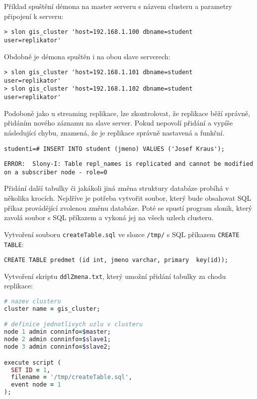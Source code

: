 Příklad spuštění démona na master serveru s názvem clusteru a parametry připojení k serveru:
\begin{lstlisting}
> slon gis_cluster 'host=192.168.1.100 dbname=student  user=replikator'
\end{lstlisting}
Obdobně je démona spuštěn i na obou slave serverech:
\begin{lstlisting}
> slon gis_cluster 'host=192.168.1.101 dbname=student  user=replikator'
> slon gis_cluster 'host=192.168.1.102 dbname=student  user=replikator'
\end{lstlisting}

Podoboně jako u streaming replikace, lze zkontrolovat, že replikace běží správně, přidáním nového záznamu na slave server. Pokud nepovolí přidání a vypíše následující chybu, znamená, že je replikace správně nastavená a funkční.

\begin{lstlisting}
studenti=# INSERT INTO student (jmeno) VALUES ('Josef Kraus');
\end{lstlisting}
\begin{lstlisting}[identifierstyle=\color{black},stringstyle=\color{black},keywordstyle=\color{black}]
ERROR:  Slony-I: Table repl_names is replicated and cannot be modified on a subscriber node - role=0
\end{lstlisting}

Přidání další tabulky či jakákoli jiná změna struktury databáze probíhá v několika krocích. Nejdříve je potřeba vytvořit soubor, který bude obsahovat SQL příkaz provádějící zvolenou změnu databáze. Poté se spustí program slonik, který zavolá soubor s SQL příkazem a vykoná jej na všech uzlech clusteru. 

Vytvoření souboru \texttt{createTable.sql} ve slozce \texttt{/tmp/} s SQL příkazem \texttt{CREATE TABLE}:

\begin{lstlisting}
CREATE TABLE predmet (id int, jmeno varchar, primary  key(id));
\end{lstlisting}

Vytvoření skriptu \texttt{ddlZmena.txt}, který umožní přidání tabulky za chodu replikace:

\begin{lstlisting}[language=ruby]
# nazev clusteru
cluster name = gis_cluster;

# definice jednotlivych uzlu v clusteru
node 1 admin conninfo=$master;
node 2 admin conninfo=$slave1;
node 3 admin conninfo=$slave2;

execute script (
  SET ID = 1,
  filename = '/tmp/createTable.sql',
  event node = 1
);

\end{lstlisting}


